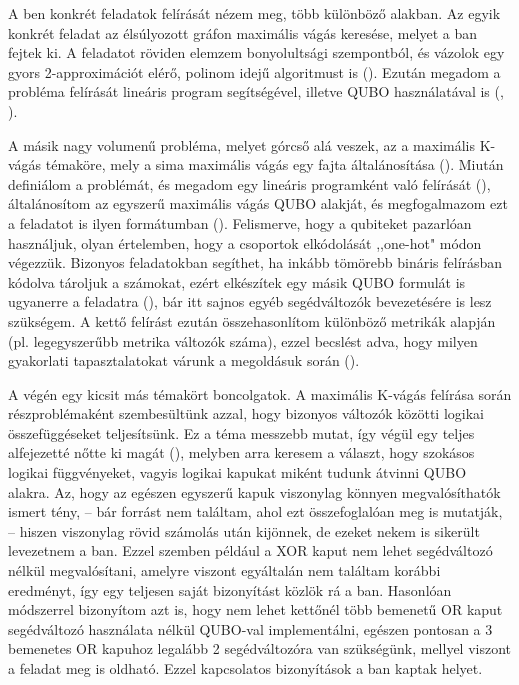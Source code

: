 
A ben konkrét feladatok felírását nézem meg, több különböző alakban. Az egyik konkrét feladat az élsúlyozott gráfon maximális vágás keresése, melyet a ban fejtek ki. A feladatot röviden elemzem bonyolultsági szempontból, és vázolok egy gyors 2-approximációt elérő, polinom idejű algoritmust is ().
Ezután megadom a probléma felírását lineáris program segítségével, illetve QUBO használatával is (, ).

A másik nagy volumenű probléma, melyet górcső alá veszek, az a maximális K-vágás témaköre, mely a sima maximális vágás egy fajta általánosítása (). Miután definiálom a problémát, és megadom egy lineáris programként való felírását (), általánosítom az egyszerű maximális vágás QUBO alakját, és megfogalmazom ezt a feladatot is ilyen formátumban (). Felismerve, hogy a qubiteket pazarlóan használjuk, olyan értelemben, hogy a csoportok elkódolását ,,one-hot" módon végezzük. Bizonyos feladatokban segíthet, ha inkább tömörebb bináris felírásban kódolva tároljuk a számokat, ezért elkészítek egy másik QUBO formulát is ugyanerre a feladatra (), bár itt sajnos egyéb segédváltozók bevezetésére is lesz szükségem. A kettő felírást ezután összehasonlítom különböző metrikák alapján (pl. legegyszerűbb metrika változók száma), ezzel becslést adva, hogy milyen gyakorlati tapasztalatokat várunk a megoldásuk során ().

A  végén egy kicsit más témakört boncolgatok. A maximális K-vágás felírása során részproblémaként szembesültünk azzal, hogy bizonyos változók közötti logikai összefüggéseket teljesítsünk. Ez a téma messzebb mutat, így végül egy teljes alfejezetté nőtte ki magát (), melyben arra keresem a választ, hogy szokásos logikai függvényeket, vagyis logikai kapukat miként tudunk átvinni QUBO alakra. Az, hogy az egészen egyszerű kapuk viszonylag könnyen megvalósíthatók ismert tény, -- bár forrást nem találtam, ahol ezt összefoglalóan meg is mutatják, -- hiszen viszonylag rövid számolás után kijönnek, de ezeket nekem is sikerült levezetnem a ban. Ezzel szemben például a XOR kaput nem lehet segédváltozó nélkül megvalósítani, amelyre viszont egyáltalán nem találtam korábbi eredményt, így egy teljesen saját bizonyítást közlök rá a ban. Hasonlóan módszerrel bizonyítom azt is, hogy nem lehet kettőnél több bemenetű OR kaput segédváltozó használata nélkül QUBO-val implementálni, egészen pontosan a 3 bemenetes OR kapuhoz legalább 2 segédváltozóra van szükségünk, mellyel viszont a feladat meg is oldható. Ezzel kapcsolatos bizonyítások a ban kaptak helyet.

